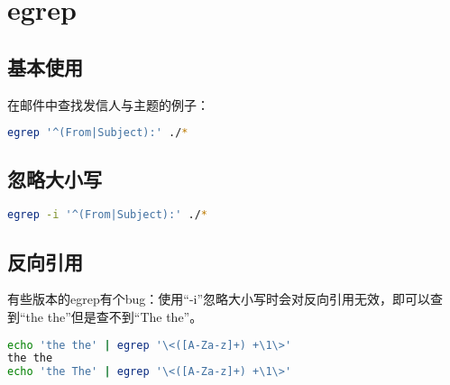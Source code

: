 \chapter{egrep}



\section{基本使用}

在邮件中查找发信人与主题的例子：

\begin{lstlisting}[language=bash]
egrep '^(From|Subject):' ./*
\end{lstlisting}



\section{忽略大小写}

\begin{lstlisting}[language=bash]
egrep -i '^(From|Subject):' ./*
\end{lstlisting}



\section{反向引用}

有些版本的egrep有个bug：使用“-i”忽略大小写时会对反向引用无效，即可以查到“the the”但是查不到“The the”。

\begin{lstlisting}[language=bash]
echo 'the the' | egrep '\<([A-Za-z]+) +\1\>'
the the
echo 'the The' | egrep '\<([A-Za-z]+) +\1\>'
\end{lstlisting}



